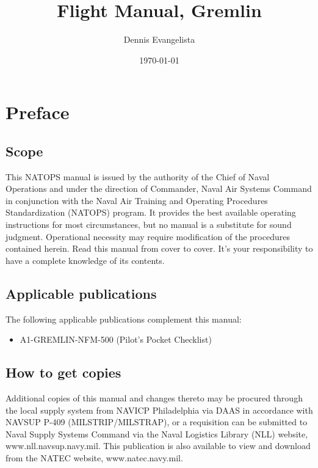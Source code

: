 \documentclass{book}
\title{Flight Manual, Gremlin}
\author{Dennis Evangelista}
\date{\today}
\begin{document}
\maketitle
\frontmatter
\pagestyle{frontmatter}
\tableofcontents
\listoffigures

\chapter*{Preface}

\section*{Scope}
This NATOPS manual is issued by the authority of the Chief of Naval Operations and under the direction of Commander, Naval Air Systems Command in conjunction with the Naval Air Training and Operating Procedures Standardization (NATOPS) program. It provides the best available operating instructions for most circumstances, but no manual is a substitute for sound judgment. Operational necessity may require modification of the procedures contained herein. Read this manual from cover to cover. It’s your responsibility to have a complete knowledge of its contents.

\section*{Applicable publications}
The following applicable publications complement this manual:
\begin{itemize}
\item A1-GREMLIN-NFM-500 (Pilot's Pocket Checklist)
\end{itemize}

\section*{How to get copies}
Additional copies of this manual and changes thereto may be procured through the local supply system from NAVICP Philadelphia via DAAS in accordance with NAVSUP P-409 (MILSTRIP/MILSTRAP), or a requisition can be submitted to Naval Supply Systems Command via the Naval Logistics Library (NLL) website, www.nll.navsup.navy.mil. This publication is also available to view and download from the NATEC website, www.natec.navy.mil.
\end{document}
